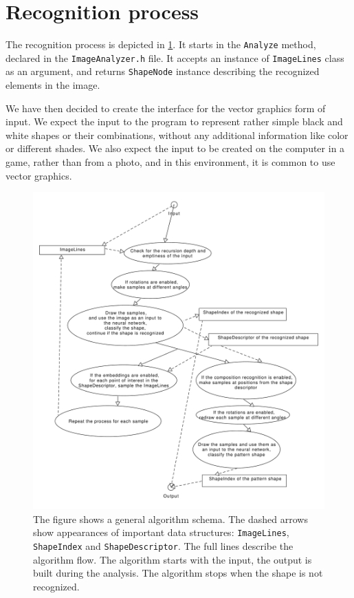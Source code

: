 \section{Recognition process}
The recognition process is depicted in \cref{fig:algoschema}. It starts in the \texttt{Analyze} method, declared in the \texttt{ImageAnalyzer.h} file. It accepts an instance of \texttt{ImageLines} class as an argument, and returns \texttt{ShapeNode} instance describing the recognized elements in the image.

We have then decided to create the interface for the vector graphics form of input. We expect the input to the program to represent rather simple black and white shapes or their combinations, without any additional information like color or different shades. We also expect the input to be created on the computer in a game, rather than from a photo, and in this environment, it is common to use vector graphics.

\begin{figure}[p]
\centering
\includegraphics[width=.9\linewidth]{ext/images/algoschema.pdf}
\caption{The figure shows a general algorithm schema. The dashed arrows show appearances of important data structures: \texttt{ImageLines}, \texttt{ShapeIndex} and \texttt{ShapeDescriptor}. The full lines describe the algorithm flow. The algorithm starts with the input, the output is built during the analysis. The algorithm stops when the shape is not recognized.}
\label{fig:algoschema}
\end{figure}

